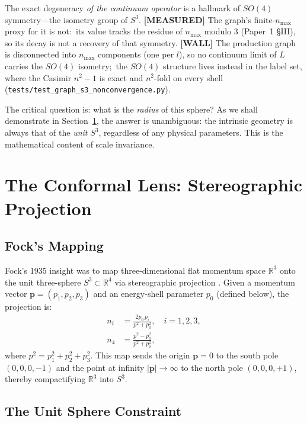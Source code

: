 \documentclass[aps,pra,twocolumn,superscriptaddress,longbibliography]{revtex4-2}
\begin{document}
The exact degeneracy \emph{of the continuum operator} is a hallmark of $SO(4)$ symmetry---the isometry group of $S^3$.  \textbf{[MEASURED]} The graph's finite-$n_{\max}$ proxy for it is not:\ its value tracks the residue of $n_{\max}$ modulo $3$ (Paper~1 \S III), so its decay is not a recovery of that symmetry. \textbf{[WALL]} The production graph is disconnected into $n_{\max}$ components (one per $l$), so no continuum limit of $L$ carries the $SO(4)$ isometry;\ the $SO(4)$ structure lives instead in the label set, where the Casimir $n^2 - 1$ is exact and $n^2$-fold on every shell (\texttt{tests/test\_graph\_s3\_nonconvergence.py}).

The critical question is: what is the \textit{radius} of this sphere? As we shall demonstrate in Section~\ref{sec:conformal}, the answer is unambiguous: the intrinsic geometry is always that of the \textit{unit} $S^3$, regardless of any physical parameters. This is the mathematical content of scale invariance.


\section{The Conformal Lens: Stereographic Projection}
\label{sec:conformal}

\subsection{Fock's Mapping}

Fock's 1935 insight was to map three-dimensional flat momentum space $\mathbb{R}^3$ onto the unit three-sphere $S^3 \subset \mathbb{R}^4$ via stereographic projection \cite{fock1935}. Given a momentum vector $\mathbf{p} = (p_1, p_2, p_3)$ and an energy-shell parameter $p_0$ (defined below), the projection is:
\begin{align}
n_i &= \frac{2p_0\, p_i}{p^2 + p_0^2}, \quad i = 1, 2, 3, \label{eq:stereo_spatial}\\
n_4 &= \frac{p^2 - p_0^2}{p^2 + p_0^2}, \label{eq:stereo_fourth}
\end{align}
where $p^2 = p_1^2 + p_2^2 + p_3^2$. This map sends the origin $\mathbf{p} = 0$ to the south pole $(0, 0, 0, -1)$ and the point at infinity $|\mathbf{p}| \to \infty$ to the north pole $(0, 0, 0, +1)$, thereby compactifying $\mathbb{R}^3$ into $S^3$.

\subsection{The Unit Sphere Constraint}
\end{document}
